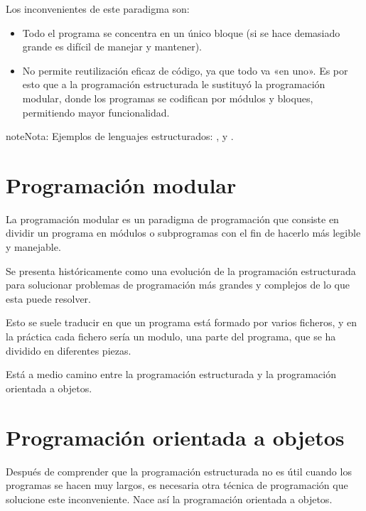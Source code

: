 \documentclass[letterpaper,10pt,spanish]{sphinxmanual}
\begin{document}
\sphinxAtStartPar
Los inconvenientes de este paradigma son:
\begin{itemize}
\item {} 
\sphinxAtStartPar
Todo el programa se concentra en un único bloque (si se hace demasiado grande es difícil de manejar y mantener).

\item {} 
\sphinxAtStartPar
No permite reutilización eficaz de código, ya que todo va «en uno». Es por esto que a la programación estructurada le sustituyó  la programación modular, donde los programas se codifican por módulos y bloques, permitiendo mayor funcionalidad.

\end{itemize}

\begin{sphinxadmonition}{note}{Nota:}
\sphinxAtStartPar
Ejemplos de lenguajes estructurados: ,  y .
\end{sphinxadmonition}


\section{Programación modular}
\label{\detokenize{lenguajes_alto_nivel_clasificacion:programacion-modular}}
\sphinxAtStartPar
La programación modular es un paradigma de programación que consiste en dividir un programa en módulos o subprogramas con el fin de hacerlo más legible y manejable.

\sphinxAtStartPar
Se presenta históricamente como una evolución de la programación estructurada para solucionar problemas de programación más grandes y complejos de lo que esta puede resolver.

\sphinxAtStartPar
Esto se suele traducir en que un programa está formado por varios ficheros, y en la práctica cada fichero sería un modulo, una parte del programa, que se ha dividido en diferentes piezas.

\sphinxAtStartPar
Está a medio camino entre la programación estructurada y la programación orientada a objetos.


\section{Programación orientada a objetos}
\label{\detokenize{lenguajes_alto_nivel_clasificacion:programacion-orientada-a-objetos}}
\sphinxAtStartPar
Después de comprender que la programación estructurada no es útil cuando los programas se hacen muy largos, es necesaria otra  técnica de programación que solucione este inconveniente. Nace así la programación orientada a objetos.
\end{document}
